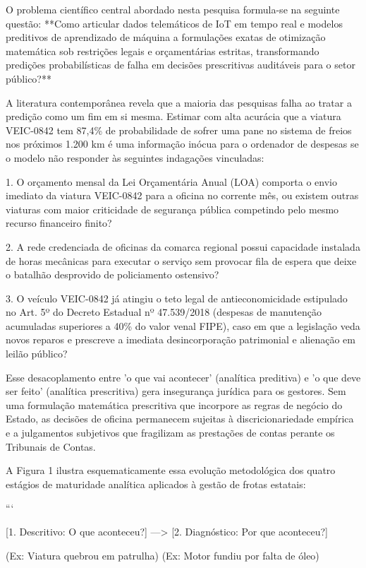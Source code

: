 \documentclass[12pt,a4paper]{article}
\begin{document}
O problema científico central abordado nesta pesquisa formula-se na seguinte questão: **Como articular dados telemáticos de IoT em tempo real e modelos preditivos de aprendizado de máquina a formulações exatas de otimização matemática sob restrições legais e orçamentárias estritas, transformando predições probabilísticas de falha em decisões prescritivas auditáveis para o setor público?**

A literatura contemporânea revela que a maioria das pesquisas falha ao tratar a predição como um fim em si mesma. Estimar com alta acurácia que a viatura VEIC-0842 tem 87,4\% de probabilidade de sofrer uma pane no sistema de freios nos próximos 1.200 km é uma informação inócua para o ordenador de despesas se o modelo não responder às seguintes indagações vinculadas:

1. O orçamento mensal da Lei Orçamentária Anual (LOA) comporta o envio imediato da viatura VEIC-0842 para a oficina no corrente mês, ou existem outras viaturas com maior criticidade de segurança pública competindo pelo mesmo recurso financeiro finito?

2. A rede credenciada de oficinas da comarca regional possui capacidade instalada de horas mecânicas para executar o serviço sem provocar fila de espera que deixe o batalhão desprovido de policiamento ostensivo?

3. O veículo VEIC-0842 já atingiu o teto legal de antieconomicidade estipulado no Art. 5º do Decreto Estadual nº 47.539/2018 (despesas de manutenção acumuladas superiores a 40\% do valor venal FIPE), caso em que a legislação veda novos reparos e prescreve a imediata desincorporação patrimonial e alienação em leilão público?

Esse desacoplamento entre 'o que vai acontecer' (analítica preditiva) e 'o que deve ser feito' (analítica prescritiva) gera insegurança jurídica para os gestores. Sem uma formulação matemática prescritiva que incorpore as regras de negócio do Estado, as decisões de oficina permanecem sujeitas à discricionariedade empírica e a julgamentos subjetivos que fragilizam as prestações de contas perante os Tribunais de Contas.

A Figura 1 ilustra esquematicamente essa evolução metodológica dos quatro estágios de maturidade analítica aplicados à gestão de frotas estatais:

```

[1. Descritivo: O que aconteceu?] ---> [2. Diagnóstico: Por que aconteceu?]

(Ex: Viatura quebrou em patrulha)       (Ex: Motor fundiu por falta de óleo)
\end{document}
